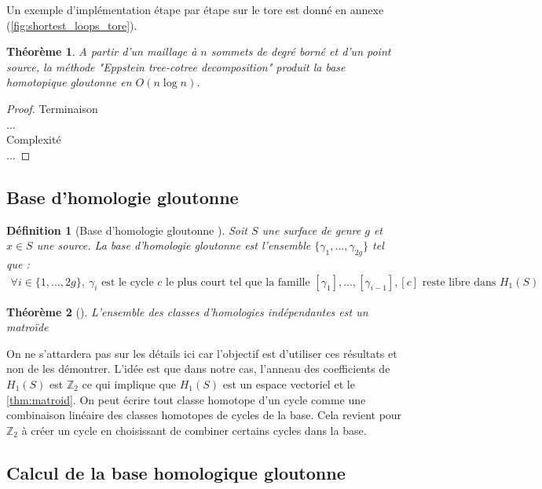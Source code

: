 \documentclass[french]{article}
\newtheorem{thm}{Théorème}[section]
\newtheorem{Def}{Définition}[section]
\begin{document}
\noindent Un exemple d'implémentation étape par étape sur le tore est donné en annexe (\autoref{fig:shortest_loops_tore}).

\begin{thm}
    A partir d'un maillage à $n$ sommets de degré borné et d'un point source, 
    la méthode "Eppstein tree-cotree decomposition" produit la base homotopique gloutonne en $O(n \log n)$.
\end{thm}

\begin{proof}
    Terminaison \\
    ... \\
    \noindent Complexité \\
    ...
\end{proof}

\subsection{Base d'homologie gloutonne}

\begin{Def}[Base d'homologie gloutonne \cite{erickson_whittlesey}]
    \label{Def: base_homologie_g}
    Soit $S$ une surface de genre $g$ et $x \in S$ une source. 
    La base d'homologie gloutonne est l'ensemble $\{\gamma_1, ..., \gamma_{2g}\}$ tel que :
    \begin{align*}
        \forall i \in \{1, ..., 2g\},\ \gamma_i 
        \text{ est le cycle } c \text{ le plus court tel que la famille }
        [\gamma_1], ..., [\gamma_{i-1}], [c]
        \text{ reste libre dans } H_1(S)
    \end{align*}
\end{Def}

\begin{thm}[\cite{erickson_whittlesey}]
    \label{thm:matroid}
    L'ensemble des classes d'homologies indépendantes est un matroïde
\end{thm}

On ne s'attardera pas sur les détails ici car l'objectif est d'utiliser ces résultats et non de les démontrer. 
L'idée est que dans notre cas, l'anneau des coefficients de $H_1(S)$ est $\mathbb{Z}_2$ ce qui implique que $H_1(S)$ est un espace vectoriel et le \autoref{thm:matroid}.
On peut écrire tout classe homotope d'un cycle comme une combinaison linéaire des classes homotopes de cycles de la base.
Cela revient pour $\mathbb{Z}_2$ à créer un cycle en choisissant de combiner certains cycles dans la base.

\subsection{Calcul de la base homologique gloutonne}
\end{document}
